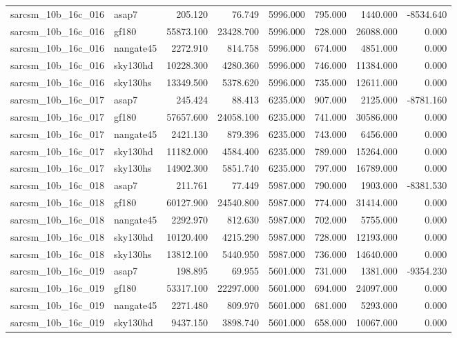 \begin{tabular}{llrrrrrr}
sarcsm\_10b\_16c\_016 & asap7 & 205.120 & 76.749 & 5996.000 & 795.000 & 1440.000 & -8534.640 \\
sarcsm\_10b\_16c\_016 & gf180 & 55873.100 & 23428.700 & 5996.000 & 728.000 & 26088.000 & 0.000 \\
sarcsm\_10b\_16c\_016 & nangate45 & 2272.910 & 814.758 & 5996.000 & 674.000 & 4851.000 & 0.000 \\
sarcsm\_10b\_16c\_016 & sky130hd & 10228.300 & 4280.360 & 5996.000 & 746.000 & 11384.000 & 0.000 \\
sarcsm\_10b\_16c\_016 & sky130hs & 13349.500 & 5378.620 & 5996.000 & 735.000 & 12611.000 & 0.000 \\
sarcsm\_10b\_16c\_017 & asap7 & 245.424 & 88.413 & 6235.000 & 907.000 & 2125.000 & -8781.160 \\
sarcsm\_10b\_16c\_017 & gf180 & 57657.600 & 24058.100 & 6235.000 & 741.000 & 30586.000 & 0.000 \\
sarcsm\_10b\_16c\_017 & nangate45 & 2421.130 & 879.396 & 6235.000 & 743.000 & 6456.000 & 0.000 \\
sarcsm\_10b\_16c\_017 & sky130hd & 11182.000 & 4584.400 & 6235.000 & 789.000 & 15264.000 & 0.000 \\
sarcsm\_10b\_16c\_017 & sky130hs & 14902.300 & 5851.740 & 6235.000 & 797.000 & 16789.000 & 0.000 \\
sarcsm\_10b\_16c\_018 & asap7 & 211.761 & 77.449 & 5987.000 & 790.000 & 1903.000 & -8381.530 \\
sarcsm\_10b\_16c\_018 & gf180 & 60127.900 & 24540.800 & 5987.000 & 774.000 & 31414.000 & 0.000 \\
sarcsm\_10b\_16c\_018 & nangate45 & 2292.970 & 812.630 & 5987.000 & 702.000 & 5755.000 & 0.000 \\
sarcsm\_10b\_16c\_018 & sky130hd & 10120.400 & 4215.290 & 5987.000 & 728.000 & 12193.000 & 0.000 \\
sarcsm\_10b\_16c\_018 & sky130hs & 13812.100 & 5440.950 & 5987.000 & 736.000 & 14640.000 & 0.000 \\
sarcsm\_10b\_16c\_019 & asap7 & 198.895 & 69.955 & 5601.000 & 731.000 & 1381.000 & -9354.230 \\
sarcsm\_10b\_16c\_019 & gf180 & 53317.100 & 22297.000 & 5601.000 & 694.000 & 24097.000 & 0.000 \\
sarcsm\_10b\_16c\_019 & nangate45 & 2271.480 & 809.970 & 5601.000 & 681.000 & 5293.000 & 0.000 \\
sarcsm\_10b\_16c\_019 & sky130hd & 9437.150 & 3898.740 & 5601.000 & 658.000 & 10067.000 & 0.000 \\

\end{tabular}
